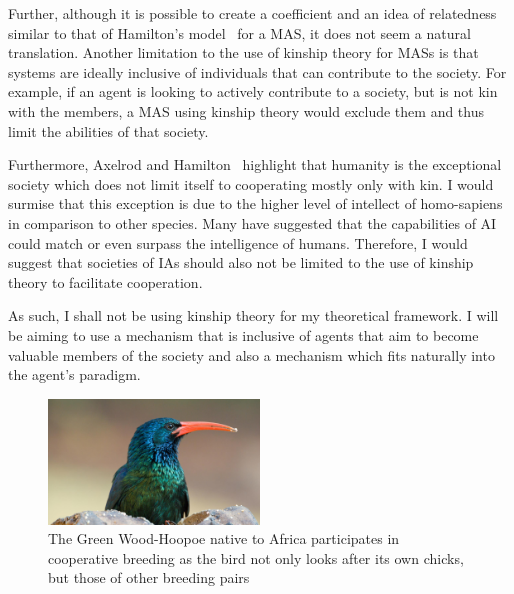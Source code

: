\documentclass[]{final_report}
\begin{document}
Further, although it is possible to create a coefficient and an idea of relatedness similar to that of Hamilton's model~\cite{kinhamilton} for a MAS, it does not seem a natural translation. Another limitation to the use of kinship theory for MASs is that systems are ideally inclusive of individuals that can contribute to the society. For example, if an agent is looking to actively contribute to a society, but is not kin with the members, a MAS using kinship theory would exclude them and thus limit the abilities of that society.\par
Furthermore, Axelrod and Hamilton~\cite{evolution_of_cooperation} highlight that humanity is the exceptional society which does not limit itself to cooperating mostly only with kin. I would surmise that this exception is due to the higher level of intellect of homo-sapiens in comparison to other species. Many have suggested that the capabilities of AI could match or even surpass the intelligence of humans. Therefore, I would suggest that societies of IAs should also not be limited to the use of kinship theory to facilitate cooperation.\par
As such, I shall not be using kinship theory for my theoretical framework. I will be aiming to use a  mechanism that is inclusive of agents that aim to become valuable members of the society and also a mechanism which fits naturally into the agent's paradigm. 
\begin{figure}
	\center
	\includegraphics[width=0.5\textwidth]{green-wood-hoopoe.jpg}
	\caption{The Green Wood-Hoopoe native to Africa participates in cooperative breeding as the bird not only looks after its own chicks, but those of other breeding pairs~\cite{hoopoe}}
	\label{fig:hoopoe}
\end{figure}
\end{document}
